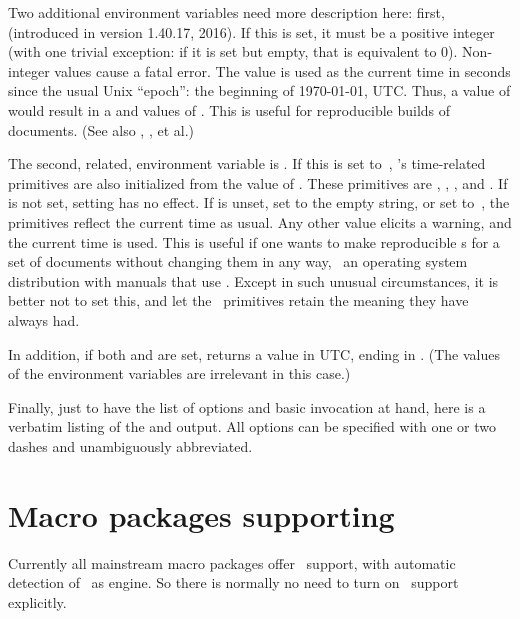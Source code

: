\documentclass{pdftexmanual}
\begin{document}
Two additional environment variables need more description here: first,
 (introduced in version 1.40.17, 2016). If this
is set, it must be a positive integer (with one trivial exception: if it
is set but empty, that is equivalent to 0). Non-integer values cause a
fatal error. The value is used as the current time in seconds since the
usual Unix ``epoch'': the beginning of 1970-01-01, UTC. Thus, a value of
 would result in a  and 
values of . This is useful for reproducible builds
of documents. (See also , ,
et al.)

The second, related, environment variable is .
If this is set to~, \TEX's time-related primitives are also
initialized from the value of . These primitives
are , , , and . If
 is not set, setting 
has no effect. If  is unset, set to the empty
string, or set to~, the primitives reflect the current time as
usual. Any other value elicits a warning, and the current time is used.
This is useful if one wants to make reproducible \PDF{}s for a set
of documents without changing them in any way, \eg\ an operating system
distribution with manuals that use . Except in such unusual
circumstances, it is better not to set this, and let the \TEX\
primitives retain the meaning they have always had.

In addition, if both  and
 are set,  returns a value
in UTC, ending in \type{Z}. (The values of the environment variables are
irrelevant in this case.)

Finally, just to have the list of options and basic invocation at hand,
here is a verbatim listing of the \type{--help} and \type{--version}
output. All options can be specified with one or two dashes and
unambiguously abbreviated.


\section{Macro packages supporting \PDFTEX}

Currently all mainstream macro packages offer \PDFTEX\ support, with
automatic detection of \PDFTEX\ as engine. So there is normally no need
to turn on \PDFTEX\ support explicitly.
\end{document}
